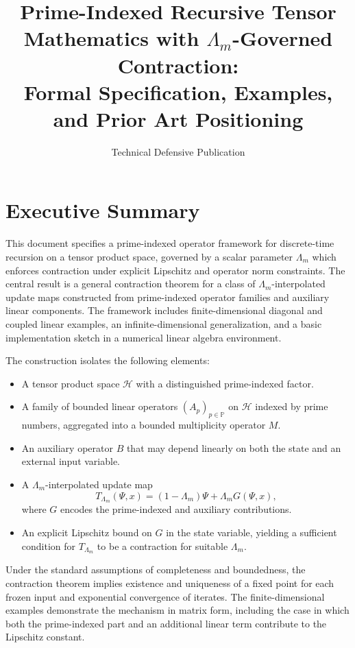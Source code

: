 \documentclass[11pt]{article}
\title{Prime-Indexed Recursive Tensor Mathematics with $\Lambda_m$-Governed Contraction:\\
Formal Specification, Examples, and Prior Art Positioning}
\author{Technical Defensive Publication}
\date{}
\begin{document}
\maketitle

\tableofcontents

\section{Executive Summary}

This document specifies a prime-indexed operator framework for discrete-time recursion on a tensor product space, governed by a scalar parameter $\Lambda_m$ which enforces contraction under explicit Lipschitz and operator norm constraints. The central result is a general contraction theorem for a class of $\Lambda_m$-interpolated update maps constructed from prime-indexed operator families and auxiliary linear components. The framework includes finite-dimensional diagonal and coupled linear examples, an infinite-dimensional generalization, and a basic implementation sketch in a numerical linear algebra environment.

The construction isolates the following elements:

\begin{itemize}
  \item A tensor product space $\mathcal{H}$ with a distinguished prime-indexed factor.
  \item A family of bounded linear operators $(A_p)_{p \in \mathbb{P}}$ on $\mathcal{H}$ indexed by prime numbers, aggregated into a bounded multiplicity operator $M$.
  \item An auxiliary operator $B$ that may depend linearly on both the state and an external input variable.
  \item A $\Lambda_m$-interpolated update map
  \[
    T_{\Lambda_m}(\Psi,x) = (1 - \Lambda_m)\Psi + \Lambda_m G(\Psi,x),
  \]
  where $G$ encodes the prime-indexed and auxiliary contributions.
  \item An explicit Lipschitz bound on $G$ in the state variable, yielding a sufficient condition for $T_{\Lambda_m}$ to be a contraction for suitable $\Lambda_m$.
\end{itemize}

Under the standard assumptions of completeness and boundedness, the contraction theorem implies existence and uniqueness of a fixed point for each frozen input and exponential convergence of iterates. The finite-dimensional examples demonstrate the mechanism in matrix form, including the case in which both the prime-indexed part and an additional linear term contribute to the Lipschitz constant.
\end{document}

